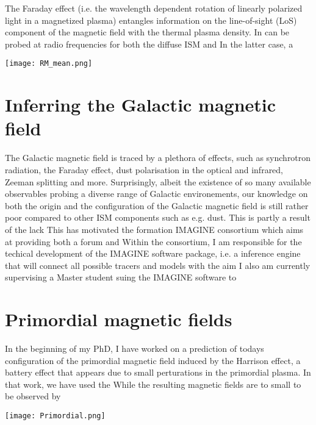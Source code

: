 The Faraday effect (i.e. the wavelength dependent rotation of linearly polarized light in a magnetized plasma) entangles information on the line-of-sight (LoS) component of the magnetic field with the thermal plasma density.
In can be probed at radio frequencies for both the diffuse ISM and
In the latter case, a

\begin{center}
  \texttt{[image: RM\_mean.png]}
\end{center}


\section{Inferring the Galactic magnetic field}

The Galactic magnetic field is traced by a plethora of effects, such as synchrotron radiation, the Faraday effect, dust polarisation in the optical and infrared, Zeeman splitting and more.
Surprisingly, albeit the existence of so many available observables probing a diverse range of Galactic environements, our knowledge on both the origin and the configuration of the Galactic magnetic field is still rather poor compared to other ISM components such as e.g. dust.
This is partly a result of the lack
This has motivated the formation IMAGINE consortium which aims at providing both a forum and
Within the consortium, I am responsible for the techical development of the IMAGINE software package, i.e. a inference engine that will connect all possible tracers and models with the aim
I also am currently supervising a Master student suing the IMAGINE software to

\section{Primordial magnetic fields}

In the beginning of my PhD, I have worked on a prediction of todays configuration of the primordial magnetic field induced by the Harrison effect, a battery effect that appears due to small perturations in the primordial plasma.
In that work, we have used the
While the resulting magnetic fields are to small to be observed by

\begin{center}
  \texttt{[image: Primordial.png]}
\end{center}

